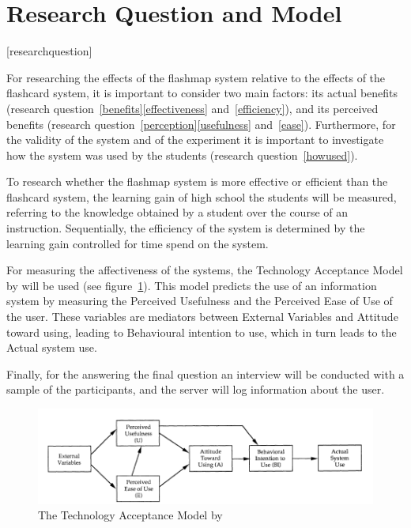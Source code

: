 \section{Research Question and Model}
\renewcommand{\theresearchquestion}{\Roman{researchquestion}}
[researchquestion]
\renewcommand{\thesubquestion}{\alph{subquestion}}



For researching the effects of the flashmap system relative to the effects of the flashcard system, it is important to consider two main factors: its actual benefits (research question~\ref{benefits}\ref{effectiveness} and~\ref{efficiency}), and its perceived benefits (research question~\ref{perception}\ref{usefulness} and~\ref{ease}). Furthermore, for the validity of the system and of the experiment it is important to investigate how the system was used by the students (research question~\ref{howused}).

To research whether the flashmap system is more effective or efficient than the flashcard system, the learning gain of high school the students will be measured, referring to the knowledge obtained by a student over the course of an instruction. Sequentially, the efficiency of the system is determined by the learning gain controlled for time spend on the system.

For measuring the affectiveness of the systems, the Technology Acceptance Model by  will be used (see figure~\ref{fig:tam}). This model predicts the use of an information system by measuring the Perceived Usefulness and the Perceived Ease of Use of the user. These variables are mediators between External Variables and Attitude toward using, leading to Behavioural intention to use, which in turn leads to the Actual system use.

Finally, for the answering the final question an interview will be conducted with a sample of the participants, and the server will log information about the user.

\begin{figure}
    \centering
    \includegraphics[width=\textwidth]{img/tam}
    \caption{The Technology Acceptance Model by \protect{}}
    \label{fig:tam}
\end{figure}

